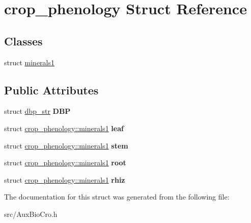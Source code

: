 \hypertarget{structcrop__phenology}{\section{crop\-\_\-phenology Struct Reference}
\label{structcrop__phenology}
}
\subsection*{Classes}
\begin{DoxyCompactItemize}
\item 
struct \hyperlink{structcrop__phenology_1_1minerals1}{minerals1}
\end{DoxyCompactItemize}
\subsection*{Public Attributes}
\begin{DoxyCompactItemize}
\item 
\hypertarget{structcrop__phenology_a717422ca7593854b4e689b7e149dc68d}{struct \hyperlink{structdbp__str}{dbp\-\_\-str} {\bfseries D\-B\-P}}\label{structcrop__phenology_a717422ca7593854b4e689b7e149dc68d}

\item 
\hypertarget{structcrop__phenology_a3885bd2737e1982e87e618a7e42e3cb3}{struct \hyperlink{structcrop__phenology_1_1minerals1}{crop\-\_\-phenology\-::minerals1} {\bfseries leaf}}\label{structcrop__phenology_a3885bd2737e1982e87e618a7e42e3cb3}

\item 
\hypertarget{structcrop__phenology_ad0b74e2e3b664cbaff1f31cfaf73a018}{struct \hyperlink{structcrop__phenology_1_1minerals1}{crop\-\_\-phenology\-::minerals1} {\bfseries stem}}\label{structcrop__phenology_ad0b74e2e3b664cbaff1f31cfaf73a018}

\item 
\hypertarget{structcrop__phenology_abe9280c39281ab1c2833457d87ed7ce0}{struct \hyperlink{structcrop__phenology_1_1minerals1}{crop\-\_\-phenology\-::minerals1} {\bfseries root}}\label{structcrop__phenology_abe9280c39281ab1c2833457d87ed7ce0}

\item 
\hypertarget{structcrop__phenology_a15cc77e11a516dd2a67039c1f4cf565c}{struct \hyperlink{structcrop__phenology_1_1minerals1}{crop\-\_\-phenology\-::minerals1} {\bfseries rhiz}}\label{structcrop__phenology_a15cc77e11a516dd2a67039c1f4cf565c}

\end{DoxyCompactItemize}


The documentation for this struct was generated from the following file\-:\begin{DoxyCompactItemize}
\item 
src/Aux\-Bio\-Cro.\-h\end{DoxyCompactItemize}
